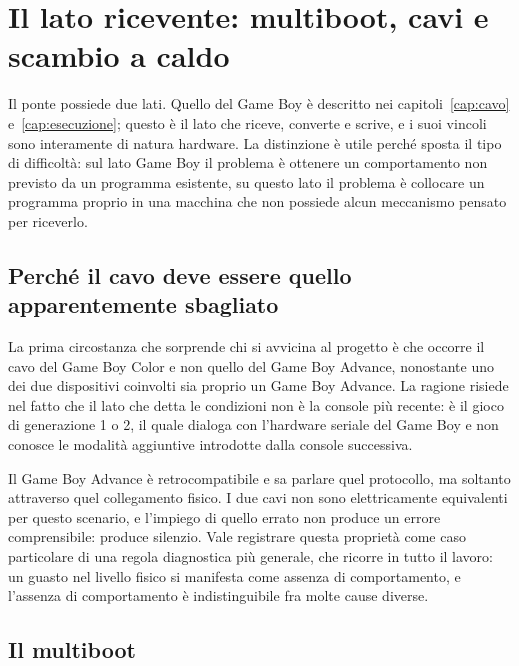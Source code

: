 
\chapter{Il lato ricevente: multiboot, cavi e scambio a caldo}
\label{cap:multiboot}

Il ponte possiede due lati. Quello del Game Boy è descritto nei capitoli~\ref{cap:cavo} e~\ref{cap:esecuzione}; questo è il lato che riceve, converte e scrive, e i suoi vincoli sono interamente di natura hardware. La distinzione è utile perché sposta il tipo di difficoltà: sul lato Game Boy il problema è ottenere un comportamento non previsto da un programma esistente, su questo lato il problema è collocare un programma proprio in una macchina che non possiede alcun meccanismo pensato per riceverlo.

\section{Perché il cavo deve essere quello apparentemente sbagliato}

La prima circostanza che sorprende chi si avvicina al progetto è che occorre il cavo del Game Boy Color e non quello del Game Boy Advance, nonostante uno dei due dispositivi coinvolti sia proprio un Game Boy Advance. La ragione risiede nel fatto che il lato che detta le condizioni non è la console più recente: è il gioco di generazione 1 o 2, il quale dialoga con l'hardware seriale del Game Boy e non conosce le modalità aggiuntive introdotte dalla console successiva.

Il Game Boy Advance è retrocompatibile e sa parlare quel protocollo, ma soltanto attraverso quel collegamento fisico. I due cavi non sono elettricamente equivalenti per questo scenario, e l'impiego di quello errato non produce un errore comprensibile: produce silenzio. Vale registrare questa proprietà come caso particolare di una regola diagnostica più generale, che ricorre in tutto il lavoro: un guasto nel livello fisico si manifesta come assenza di comportamento, e l'assenza di comportamento è indistinguibile fra molte cause diverse.

\section{Il multiboot}

